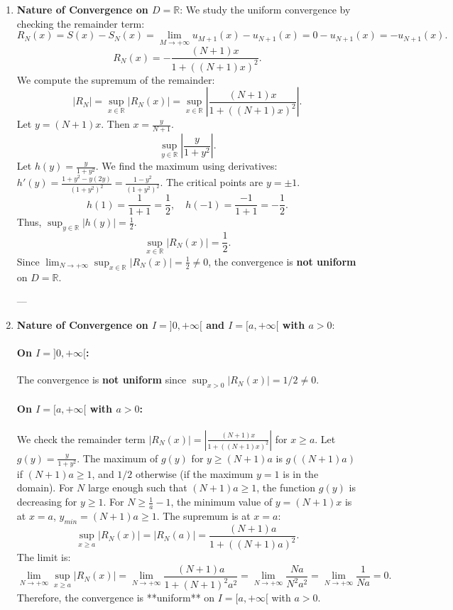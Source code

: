 \documentclass[12pt]{article}
\begin{document}
\begin{correctionbox}
\begin{enumerate}
    \item \textbf{Nature of Convergence on $D = \mathbb{R}$}:
    We study the uniform convergence by checking the remainder term:
    $$ R_N(x) = S(x) - S_N(x) = \lim_{M \to +\infty} u_{M+1}(x) - u_{N+1}(x) = 0 - u_{N+1}(x) = -u_{N+1}(x). $$
    $$ R_N(x) = -\frac{(N+1)x}{1+((N+1)x)^2}. $$
    We compute the supremum of the remainder:
    $$ |R_N| = \sup_{x \in \mathbb{R}} |R_N(x)| = \sup_{x \in \mathbb{R}} \left|\frac{(N+1)x}{1+((N+1)x)^2}\right|. $$
    Let $y = (N+1)x$. Then $x = \frac{y}{N+1}$.
    $$ \sup_{y \in \mathbb{R}} \left|\frac{y}{1+y^2}\right|. $$
    Let $h(y) = \frac{y}{1+y^2}$. We find the maximum using derivatives: $h'(y) = \frac{1+y^2 - y(2y)}{(1+y^2)^2} = \frac{1-y^2}{(1+y^2)^2}$.
    The critical points are $y = \pm 1$.
    $$ h(1) = \frac{1}{1+1} = \frac{1}{2}, \quad h(-1) = \frac{-1}{1+1} = -\frac{1}{2}. $$
    Thus, $\sup_{y \in \mathbb{R}} |h(y)| = \frac{1}{2}$.
    $$ \sup_{x \in \mathbb{R}} |R_N(x)| = \frac{1}{2}. $$
    Since $\lim_{N \to +\infty} \sup_{x \in \mathbb{R}} |R_N(x)| = \frac{1}{2} \neq 0$, the convergence is \textbf{not uniform} on $D = \mathbb{R}$.

    ---

    \item \textbf{Nature of Convergence on $I = ]0, +\infty[$ and $I = [a, +\infty[$ with $a > 0$}:
    \paragraph{On $I = ]0, +\infty[$:}
    The convergence is \textbf{not uniform} since $\sup_{x > 0} |R_N(x)| = 1/2 \neq 0$.

    \paragraph{On $I = [a, +\infty[$ with $a > 0$:}
    We check the remainder term $|R_N(x)| = \left|\frac{(N+1)x}{1+((N+1)x)^2}\right|$ for $x \geq a$.
    Let $g(y) = \frac{y}{1+y^2}$. The maximum of $g(y)$ for $y \geq (N+1)a$ is $g((N+1)a)$ if $(N+1)a \geq 1$, and $1/2$ otherwise (if the maximum $y=1$ is in the domain).
    For $N$ large enough such that $(N+1)a \geq 1$, the function $g(y)$ is decreasing for $y \geq 1$.
    For $N \geq \frac{1}{a}-1$, the minimum value of $y = (N+1)x$ is at $x=a$, $y_{min} = (N+1)a \geq 1$.
    The supremum is at $x=a$:
    $$ \sup_{x \geq a} |R_N(x)| = |R_N(a)| = \frac{(N+1)a}{1+((N+1)a)^2}. $$
    The limit is:
    $$ \lim_{N \to +\infty} \sup_{x \geq a} |R_N(x)| = \lim_{N \to +\infty} \frac{(N+1)a}{1+(N+1)^2a^2} = \lim_{N \to +\infty} \frac{Na}{N^2a^2} = \lim_{N \to +\infty} \frac{1}{Na} = 0. $$
    Therefore, the convergence is **uniform** on $I = [a, +\infty[$ with $a > 0$.
\end{enumerate}
\end{correctionbox}
\end{document}
